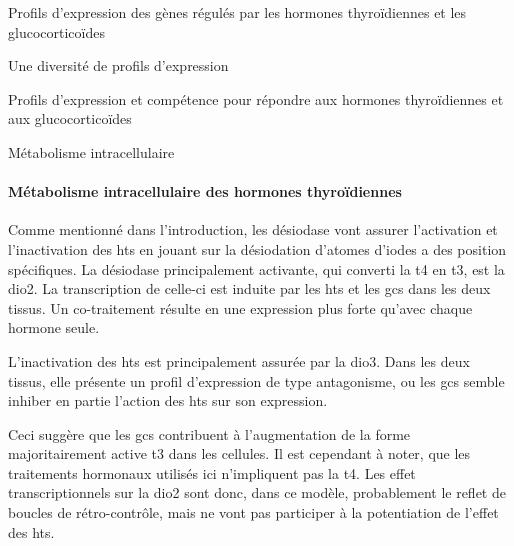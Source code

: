 \documentclass[../main.tex]{subfiles}
\begin{document}
\begin{chapter}{Profils d'expression des gènes régulés par les hormones thyroïdiennes et les glucocorticoïdes}
\begin{section}{Une diversité de profils d'expression}
\begin{subsection}{Profils d'expression et compétence pour répondre aux hormones thyroïdiennes et aux glucocorticoïdes}
\begin{subsubsection}{Métabolisme intracellulaire}
\paragraph{Métabolisme intracellulaire des hormones thyroïdiennes}
Comme mentionné dans l'introduction, les désiodase vont assurer l'activation et l'inactivation des \glspl{ht} en jouant sur la désiodation d'atomes d'iodes a des position spécifiques.
La désiodase principalement activante, qui converti la \gls{t4} en \gls{t3}, est la \gls{dio2}.
La transcription de celle-ci est induite par les \glspl{ht} et les \glspl{gc} dans les deux tissus.
Un co-traitement résulte en une expression plus forte qu'avec chaque hormone seule.
\par
L'inactivation des \glspl{ht} est principalement assurée par la \gls{dio3}.
Dans les deux tissus, elle présente un profil d'expression de type antagonisme, ou les \glspl{gc} semble inhiber en partie l'action des \glspl{ht} sur son expression.
\par
Ceci suggère que les \glspl{gc} contribuent à l'augmentation de la forme majoritairement active \gls{t3} dans les cellules.
Il est cependant à noter, que les traitements hormonaux utilisés ici n'impliquent pas la \gls{t4}.
Les effet transcriptionnels sur la \gls{dio2} sont donc, dans ce modèle, probablement le reflet de boucles de rétro-contrôle, mais ne vont pas participer à la potentiation de l'effet des \glspl{ht}.


\end{subsubsection}
\end{subsection}
\end{section}
\end{chapter}
\end{document}
